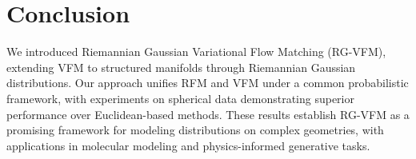 \section{Conclusion}\label{sec:conclusion}
We introduced Riemannian Gaussian Variational Flow Matching (RG-VFM), extending VFM to structured manifolds through Riemannian Gaussian distributions. Our approach unifies RFM and VFM under a common probabilistic framework, with experiments on spherical data demonstrating superior performance over Euclidean-based methods. These results establish RG-VFM as a promising framework for modeling distributions on complex geometries, with applications in molecular modeling and physics-informed generative tasks.